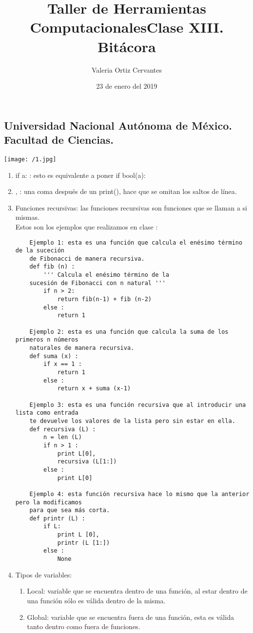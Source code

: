 \documentclass{article} %
\title{\Huge Taller de Herramientas Computacionales}
\author{\huge Valeria Ortiz Cervantes}
\date{\LARGE 23 de enero del 2019}
\begin{document}
\maketitle
\begin{center}
	\subsection*{\LARGE Universidad Nacional Autónoma de México.\\Facultad de Ciencias.\\}
	\texttt{[image: /1.jpg]}
\end{center}
\newpage
\title{\LARGE Clase XIII. Bitácora\\}
\begin{enumerate}
	\item if a: : esto es equivalente a poner if bool(a):
	\item , : una coma después de un print(), hace que se omitan los saltos de línea. 
	\item Funciones recursivas: las funciones recursivas son funciones que se llaman a si mismas.\\ Estos son los ejemplos que realizamos en clase :
	\begin{verbatim}
	Ejemplo 1: esta es una función que calcula el enésimo término de la suceción 
	de Fibonacci de manera recursiva.
	def fib (n) :
	    ''' Calcula el enésimo término de la
	sucesión de Fibonacci con n natural '''
	    if n > 2:
	        return fib(n-1) + fib (n-2)
	    else :
	        return 1
	
	Ejemplo 2: esta es una función que calcula la suma de los primeros n números 
	naturales de manera recursiva.
	def suma (x) :
	    if x == 1 :
	        return 1
	    else :
	        return x + suma (x-1)
	
	Ejemplo 3: esta es una función recursiva que al introducir una lista como entrada 
	te devuelve los valores de la lista pero sin estar en ella.
	def recursiva (L) :
	    n = len (L)
	    if n > 1 :
	        print L[0],
	        recursiva (L[1:])
	    else :
	        print L[0]
	
	Ejemplo 4: esta función recursiva hace lo mismo que la anterior pero la modificamos 
	para que sea más corta.
	def printr (L) :
	    if L:
	        print L [0],
	        printr (L [1:])
	    else :
	        None
	\end{verbatim}
	\item Tipos de variables:
	\begin{enumerate}
		\item Local: variable que se encuentra dentro de una función, al estar dentro de una función sólo es válida dentro de la misma. 
		\item Global: variable que se encuentra fuera de una función, esta es válida tanto dentro como fuera de funciones. 
	\end{enumerate}
\end{enumerate}
\end{document}
